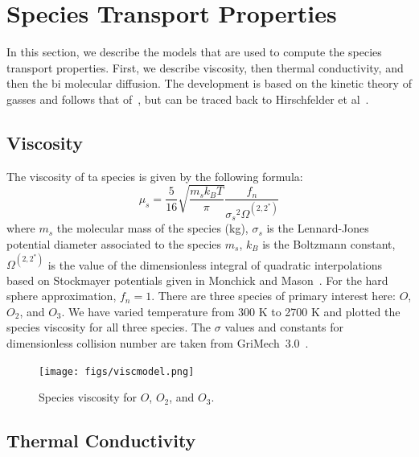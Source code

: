 \section{Species Transport Properties}\label{sec:species-trans}

In this section, we describe the models that are used to compute the
species transport properties. First, we describe viscosity, then
thermal conductivity, and then the bi molecular diffusion. The
development is based on the kinetic theory of gasses and follows that of~\cite{Kee}, but can be traced back to
Hirschfelder et al~\cite{Curtiss}.

\subsection{Viscosity}
The viscosity of ta species is given by the following formula:
\begin{equation}
\mu_s = \frac{5}{16}\sqrt{\frac{m_s k_B T}{\pi}}\frac{f_n}{{\sigma_s}^2   \Omega^{(2,2^*)}}
\end{equation}
%
where $m_s$ the molecular mass of the species (kg), $\sigma_s$ is the
Lennard-Jones potential diameter associated to the species $m_s$,
$k_B$ is the Boltzmann constant, $\Omega^{(2,2^*)}$ is the value of
the dimensionless  integral of  quadratic
interpolations based on Stockmayer potentials given in
Monchick and Mason~\cite{Monchick}. For the hard sphere approximation,
$f_n = 1$.  There are three species of primary interest here: $O$,
$O_2$, and $O_3$. We have varied temperature from 300 K to 2700 K and
plotted the species viscosity for all three species. The $\sigma$
values and constants for dimensionless collision number are taken from
GriMech~3.0~\cite{gri}.
\begin{figure}[H]
  \centering
  \texttt{[image: figs/viscmodel.png]}
   \caption{Species viscosity for $O$, $O_2$, and $O_3$.}
\end{figure}


\subsection{Thermal Conductivity}

